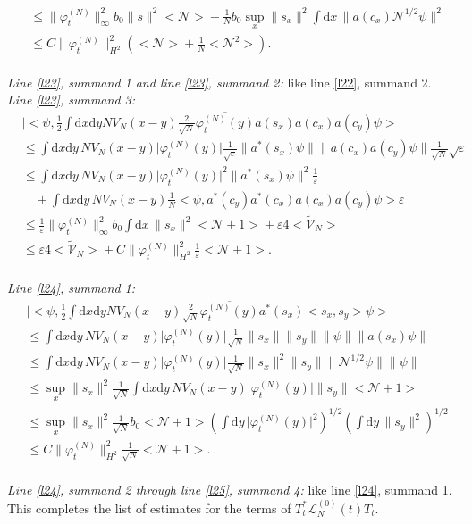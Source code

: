 \documentclass[11pt,a4paper,DIV11]{scrartcl}	%
\newcommand{\di}{\textrm{d}}		%
\newcommand{\Lcal}{\mathcal{L}}		%
\newcommand{\Ncal}{\mathcal{N}}		%
\newcommand{\tilV}{\tilde{\mathcal{V}}_N}		%
\newcommand{\estlist}[2]{\emph{\vspace{.3em}\\Line \ref{l#1}, summand #2:}}
\newcommand{\nestlist}[2]{line \ref{l#1}, summand #2}
\newcommand{\Nestlist}[2]{Line \ref{l#1}, summand #2}
\newcommand{\scal}[2]{\big<#1,#2\big>} %
\newcommand{\cc}[1]{\overline{#1}}	%
\newcommand{\norm}[1]{\lVert#1\rVert}	%
\newcommand{\ev}[1]{\big<#1\big>}	%
\newcommand{\ph}{\varphi_t^{(N)}}	%
\newcommand{\dxyNV}{\frac{1}{2}\int \di x\di y N V_N(x-y)} %
\begin{document}
\begin{fleqn}[0.5em]
\begin{align*}
& \leq \norm{\ph}_\infty^2 b_0 \norm{s}^2 \ev{\Ncal} + \frac{1}{N}b_0 \sup_x\norm{s_x}^2 \int \di x\, \norm{a(c_x)\Ncal^{1/2}\psi}^2 \\
& \leq C \norm{\ph}_{H^2}^2 \left( \ev{\Ncal} + \frac{1}{N}\ev{\Ncal^2}\right). 
\end{align*}
\emph{\vspace{.3em}\\\Nestlist{23}{1} and \nestlist{23}{2}:} %
like \nestlist{22}{2}.\newline
\estlist{23}{3}
\begin{align*}
& \lvert \scal{\psi}{\dxyNV \frac{2}{\sqrt{N}} \cc{\ph(y)} a(s_x) a(c_x) a(c_y)\psi} \rvert \\
& \leq \int \di x\di y\, NV_N(x-y) \lvert \ph(y)\rvert \frac{1}{\sqrt{\varepsilon}} \norm{a^\ast(s_x)\psi} \norm{a(c_x)a(c_y)\psi}\frac{1}{\sqrt{N}}\sqrt{\varepsilon} \\
& \leq \int \di x\di y\, NV_N(x-y) \lvert \ph(y)\rvert^2
  \norm{a^\ast(s_x)\psi}^2\frac{1}{\varepsilon} \\
& \quad + \int \di x\di y\, NV_N(x-y) \frac{1}{N} \scal{\psi}{a^\ast(c_y)a^\ast(c_x)a(c_x)a(c_y)\psi}\varepsilon \\
& \leq \frac{1}{\varepsilon} \norm{\ph}_\infty^2 b_0 \int \di x\, \norm{s_x}^2 \ev{\Ncal+1} + \varepsilon 4 \ev{\tilV}\\
& \leq \varepsilon 4 \ev{\tilV} + C\norm{\ph}_{H^2}^2 \frac{1}{\varepsilon}\ev{\Ncal+1}.
\end{align*}
\estlist{24}{1}
\begin{align*}
 & \lvert \scal{\psi}{\dxyNV \frac{2}{\sqrt{N}}\cc{\ph(y)}a^\ast(s_x)\scal{s_x}{s_y}\psi} \rvert \\
& \leq \int \di x\di y\, NV_N(x-y) \lvert \ph(y)\rvert \frac{1}{\sqrt{N}} \norm{s_x} \norm{s_y} \norm{\psi} \norm{a(s_x)\psi} \\
& \leq \int \di x\di y\, NV_N(x-y) \lvert \ph(y)\rvert \frac{1}{\sqrt{N}} \norm{s_x}^2 \norm{s_y} \norm{\Ncal^{1/2}\psi} \norm{\psi} \\
& \leq \sup_x \norm{s_x}^2 \frac{1}{\sqrt{N}} \int \di x\di y\, NV_N(x-y) \lvert \ph(y)\rvert \norm{s_y} \ev{\Ncal+1} \\
& \leq \sup_x \norm{s_x}^2 \frac{1}{\sqrt{N}} b_0 \ev{\Ncal+1} \left( \int \di y\, \lvert \ph(y)\rvert^2 \right)^{1/2} \left( \int \di y\, \norm{s_y}^2 \right)^{1/2} \\
& \leq C\norm{\ph}_{H^2}^2 \frac{1}{\sqrt{N}}\ev{\Ncal+1}.
\end{align*}
\emph{\vspace{.3em}\\\Nestlist{24}{2} through \nestlist{25}{4}:} like \nestlist{24}{1}.\vspace{.3em}\newline
This completes the list of estimates for the terms of $T^*_t \Lcal_N^{(0)}(t) T_t$.\vspace{1em}
\end{fleqn}
\end{document}

